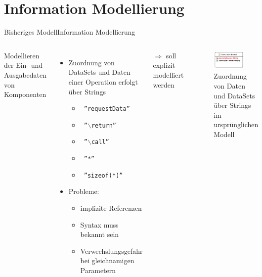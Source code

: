 \documentclass{sdqbeamer}
\begin{document}
\section{Information Modellierung}
\begin{frame}{Bisheriges Modell}{Information Modellierung}
		\begin{columns}
		Modellieren der Ein- und Ausgabedaten von Komponenten
		\begin{itemize}
			\item Zuordnung von DataSets und Daten einer Operation erfolgt über Strings
			\begin{itemize}
				\item \texttt{  ''requestData''}
				\item \texttt{  ''$\backslash$return''}
				\item \texttt{  ''$\backslash$call''}
				\item \texttt{  ''*''}
				\item \texttt{  ''sizeof(*)''}
			\end{itemize}
			\item Probleme:
			\begin{itemize}
				\item implizite Referenzen
				\item Syntax muss bekannt sein
				\item Verwechslungsgefahr bei gleichnamigen Parametern
			\end{itemize}
		\end{itemize}
		$\Rightarrow$ soll explizit modelliert werden
		\begin{center}
			\begin{figure}
				\includegraphics[width=0.7\textwidth]{images/ParameterAndDataPair.pdf}
				\caption{Zuordnung von Daten und DataSets über Strings im ursprünglichen Modell}
			\end{figure}
		\end{center}
		\vspace{0.02\textheight}
		
	\end{columns}	
\end{frame}
\end{document}
